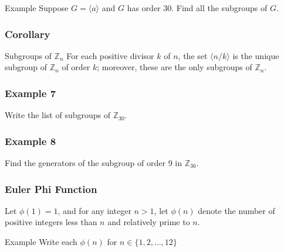 \documentclass{beamer}
\begin{document}
    \begin{frame}{Example}
        Suppose \(G=\langle a\rangle\) and \(G\) has order 30. Find all the subgroups of \(G\).
    
    \end{frame}

    \begin{frame}
        \frametitle{Corollary}
        \begin{block}{Subgroups of \(\mathbb{Z}_n\)}
        For each positive divisor \(k\) of \(n\), the set \(\langle n/k\rangle\) is the unique subgroup of \(\mathbb{Z}_n\) of order \(k\); moreover, these are the only subgroups of \(\mathbb{Z}_n\).    
        \end{block}
    \end{frame}

    \begin{frame}
        \frametitle{Example 7}
    Write the list of subgroups of \(\mathbb{Z}_{30}\). 
    \end{frame}

\begin{frame}
    \frametitle{Example 8}
Find the generators of the subgroup of order 9 in \(\mathbb{Z}_{36}\). 
    

\end{frame}


\begin{frame}
    \frametitle{Euler Phi Function}
Let \(\phi(1)=1\), and for any integer \(n>1\), let \(\phi(n)\) denote the number of positive integers less than \(n\) and relatively prime to \(n\). 

\begin{block}{Example} Write each \(\phi(n)\) for \(n \in \{1,2, \dots, 12\}\)
    
\end{block}
    

\end{frame}
\end{document}
